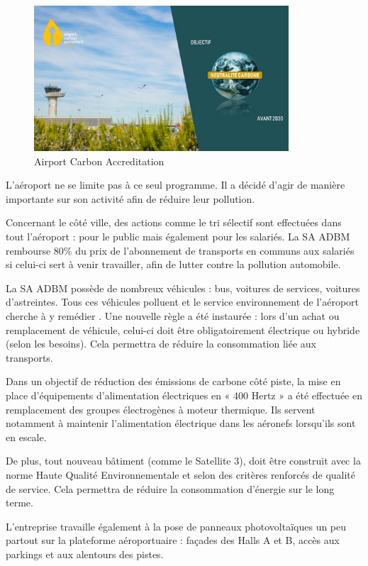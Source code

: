\begin{figure}[hbt!]
  \centering
  \includegraphics[width=9.5cm]{Images/aca2030.jpg}
  \caption{Airport Carbon Accreditation}
  \label{fig:aca2030}
\end{figure}


L'aéroport ne se limite pas à ce seul programme. Il a décidé d'agir de manière importante sur son activité afin de réduire leur pollution.


Concernant le côté ville, des actions comme le tri sélectif sont effectuées dans tout l'aéroport : pour le public mais également pour les salariés. La SA ADBM rembourse 80\% du prix de l'abonnement de transports en communs aux salariés si celui-ci sert à venir travailler, afin de lutter contre la pollution automobile.


La SA ADBM possède de nombreux véhicules : bus, voitures de services, voitures d'astreintes. Tous ces véhicules polluent et le service environnement de l'aéroport cherche à y remédier . Une nouvelle règle a été instaurée : lors d'un achat ou remplacement de véhicule, celui-ci doit être obligatoirement électrique ou hybride (selon les besoins). Cela permettra de réduire la consommation liée aux transports.\newline


Dans un objectif de réduction des émissions de carbone côté piste, la mise en place d’équipements d’alimentation électriques en « 400 Hertz » a été effectuée en remplacement des groupes électrogènes à moteur thermique. Ils servent notamment à maintenir l'alimentation électrique dans les aéronefs lorsqu'ils sont en escale.


De plus, tout nouveau bâtiment (comme le Satellite 3), doit être construit avec la norme Haute Qualité Environnementale et selon des critères renforcés de qualité de service. Cela permettra de réduire la consommation d'énergie sur le long terme.\newline


L'entreprise travaille également à la pose de panneaux photovoltaïques un peu partout sur la plateforme aéroportuaire : façades des Halls A et B, accès aux parkings et aux alentours des pistes.\newline


